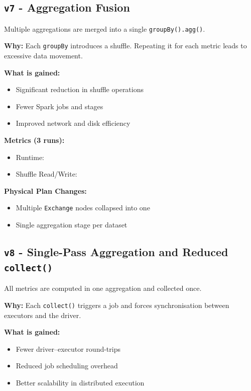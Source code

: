 \documentclass[conference,a4paper]{IEEEtran}
\begin{document}
\subsection{\texttt{v7} - Aggregation Fusion}
\label{sec:v7}

Multiple aggregations are merged into a single
\texttt{groupBy().agg()}.

\textbf{Why:}
Each \texttt{groupBy} introduces a shuffle. Repeating it for each metric leads
to excessive data movement.

\textbf{What is gained:}
\begin{itemize}
    \item Significant reduction in shuffle operations
    \item Fewer Spark jobs and stages
    \item Improved network and disk efficiency
\end{itemize}

\textbf{Metrics (3 runs):}
\begin{itemize}
    \item Runtime: \texttt{}
    \item Shuffle Read/Write: \texttt{}
\end{itemize}

\textbf{Physical Plan Changes:}
\begin{itemize}
    \item Multiple \texttt{Exchange} nodes collapsed into one
    \item Single aggregation stage per dataset
\end{itemize}

\subsection{\texttt{v8} - Single-Pass Aggregation and Reduced \texttt{collect()}}
\label{sec:v8}

All metrics are computed in one aggregation and collected once.

\textbf{Why:}
Each \texttt{collect()} triggers a job and forces synchronisation between
executors and the driver.

\textbf{What is gained:}
\begin{itemize}
    \item Fewer driver–executor round-trips
    \item Reduced job scheduling overhead
    \item Better scalability in distributed execution
\end{itemize}
\end{document}
